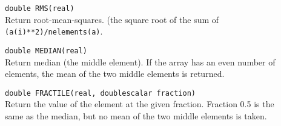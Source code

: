 \begin{description}
  \item[] \texttt{double RMS(real)}\\
    Return root-mean-squares. (the square root of the sum of
    \\\texttt{(a(i)**2)/nelements(a)}.
  \item[] \texttt{double MEDIAN(real)}\\
    Return median (the middle element).
    If the array has an even number of elements, the mean of
    the two middle elements is returned.
  \item[] \texttt{double FRACTILE(real, doublescalar fraction)}\\
    Return the value of the element at the given fraction.
    Fraction 0.5 is the same as the median, but no mean of the two middle
    elements is taken.
\end{description}

